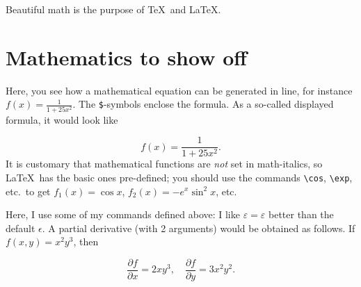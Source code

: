 \renewcommand\TheFile{ch03_mathematics.tex}
\newcommand\premathpar{\vspace{-2\parskip}\par}
\begin{savequote}[15cm]
  \raggedleft
  \sffamily
  Beautiful math is the purpose of \TeX\ and \LaTeX.
\end{savequote}
\chapter{Mathematics to show off}
\newcommand{\half}{\frac{1}{2}}
\newcommand{\eps}{\varepsilon}
\newcommand{\rh}{\rho}
\newcommand{\mtheta}{\vartheta}
\newcommand{\ph}{\varphi}
\newcommand{\der}[2]{\frac{\partial {#1}}{\partial {#2}}}

Here, you see how a mathematical equation can be generated in line, for
instance $f(x) = \frac{1}{1+25 x^2}$.
The \verb+$+-symbols enclose the formula.
As a so-called displayed formula, it would look like\premathpar
\begin{displaymath}
  f(x) = \frac{1}{1+25 x^2}.
\end{displaymath}
It is customary that mathematical functions are \emph{not} set in math-italics,
so \LaTeX\ has the basic ones pre-defined; you should use the commands
\verb+\cos+, \verb+\exp+, etc.\ to get $f_1(x) = \cos x$,
$f_2(x) = - e^x \sin^2 x$, etc.

Here, I use some of my commands defined above: I like $\eps = \varepsilon$
better than the default $\epsilon$. A partial derivative (with 2 arguments)
would be obtained as follows. If $f(x,y) = x^2 y^3$, then \premathpar
\begin{displaymath}
  \der{f}{x} = 2 x y^3, \quad \der{f}{y} = 3 x^2 y^2.
\end{displaymath}
